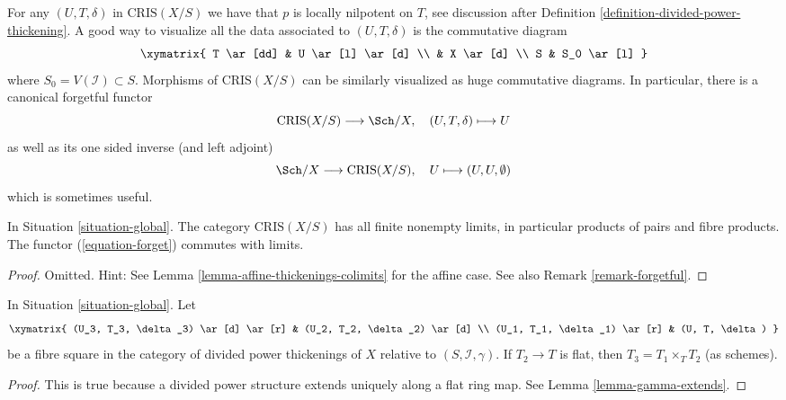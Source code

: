 \noindent
For any $(U, T, \delta)$ in $\text{CRIS}(X/S)$
we have that $p$ is locally nilpotent on $T$, see discussion after
Definition \ref{definition-divided-power-thickening}.
A good way to visualize all the data associated to $(U, T, \delta)$
is the commutative diagram
$$
\xymatrix{
T \ar[dd] & U \ar[l] \ar[d] \\
& X \ar[d] \\
S & S_0 \ar[l]
}
$$
where $S_0 = V(\mathcal{I}) \subset S$. Morphisms of $\text{CRIS}(X/S)$
can be similarly visualized as huge commutative diagrams. In particular,
there is a canonical forgetful functor
\begin{equation}
\label{equation-forget}
\text{CRIS}(X/S) \longrightarrow \Sch/X,\quad
(U, T, \delta) \longmapsto U
\end{equation}
as well as its one sided inverse (and left adjoint)
\begin{equation}
\label{equation-endow-trivial}
\Sch/X \longrightarrow \text{CRIS}(X/S),\quad
U \longmapsto (U, U, \emptyset)
\end{equation}
which is sometimes useful.

\begin{lemma}
\label{lemma-divided-power-thickening-fibre-products}
In Situation \ref{situation-global}.
The category $\text{CRIS}(X/S)$ has all finite nonempty limits,
in particular products of pairs and fibre products.
The functor (\ref{equation-forget}) commutes with limits.
\end{lemma}

\begin{proof}
Omitted. Hint: See Lemma \ref{lemma-affine-thickenings-colimits}
for the affine case. See also Remark \ref{remark-forgetful}.
\end{proof}

\begin{lemma}
\label{lemma-divided-power-thickening-base-change-flat}
In Situation \ref{situation-global}. Let
$$
\xymatrix{
(U_3, T_3, \delta_3) \ar[d] \ar[r] & (U_2, T_2, \delta_2) \ar[d] \\
(U_1, T_1, \delta_1) \ar[r] & (U, T, \delta)
}
$$
be a fibre square in the category of divided power thickenings of
$X$ relative to $(S, \mathcal{I}, \gamma)$. If $T_2 \to T$ is
flat, then $T_3 = T_1 \times_T T_2$ (as schemes).
\end{lemma}

\begin{proof}
This is true because a divided power structure extends uniquely
along a flat ring map. See Lemma \ref{lemma-gamma-extends}.
\end{proof}

